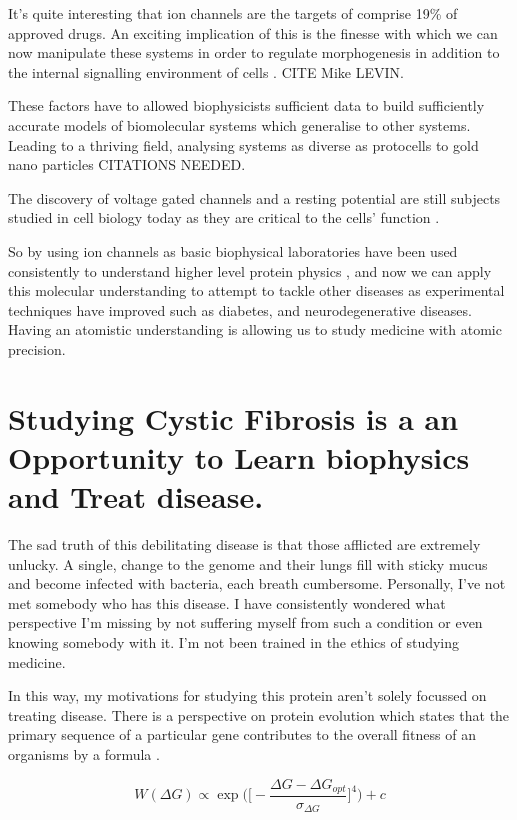 It's quite interesting that ion channels are the targets of comprise 19\% of approved drugs.\cite{santos2017} An exciting implication of this is the finesse with which we can now manipulate these systems in order to regulate morphogenesis in addition to the internal signalling environment of cells \cite{}. CITE Mike LEVIN.

These factors have to allowed biophysicists sufficient data to build sufficiently accurate models of biomolecular systems which generalise to other systems. Leading to a thriving field, analysing systems as diverse as protocells to gold nano particles CITATIONS NEEDED.

The discovery of voltage gated channels and a resting potential are still subjects studied in cell biology today as they are critical to the cells' function \cite{}.

So by using ion channels as basic biophysical laboratories have been used consistently to understand higher level protein physics \cite{}, and now we can apply this molecular understanding to attempt to tackle other diseases as experimental techniques have improved such as diabetes, and neurodegenerative diseases. Having an atomistic understanding is allowing us to study medicine with atomic precision.


\section{Studying Cystic Fibrosis is a an Opportunity to Learn biophysics and Treat disease.} 

The sad truth of this debilitating disease is that those afflicted are extremely unlucky. A single, change to the genome and their lungs fill with sticky mucus and become infected with bacteria, each breath cumbersome. Personally, I've not met somebody who has this disease. I have consistently wondered what perspective I'm missing by not suffering myself from such a condition or even knowing somebody with it. I'm not been trained in the ethics of studying medicine.

In this way, my motivations for studying this protein aren't solely focussed on treating disease. There is a perspective on protein evolution which states that the primary sequence of a particular gene contributes to the overall fitness of an organisms by a formula \cite{depristo2005a}.

\begin{equation}
	W(\Delta G) \propto \exp\bigg(\bigg[-\frac{\Delta G - \Delta G_{opt}}{\sigma_{\Delta G}}\bigg]^4\bigg) + c
\end{equation}

